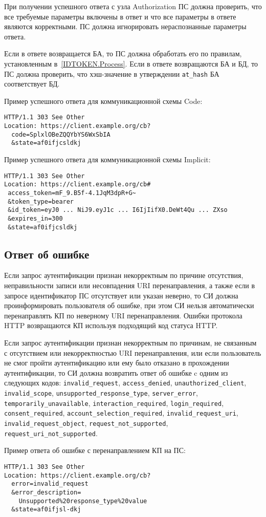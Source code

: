 При получении успешного ответа с узла Authorization ПС должна 
проверить, что все требуемые параметры включены в ответ
и что все параметры в ответе являются корректными.
%
ПС должна игнорировать нераспознанные параметры ответа.

Если в ответе возвращается БА, то ПС должна обработать его по правилам, 
установленным в~\ref{IDTOKEN.Process}. 
%
Если в ответе возвращаются БА и БД, то ПС должна проверить, что хэш-значение
в утверждении \lstinline{at_hash} БА соответствует БД.

Пример успешного ответа для коммуникационной схемы Code:
%
\begin{lstlisting}
HTTP/1.1 303 See Other
Location: https://client.example.org/cb?
  code=SplxlOBeZQQYbYS6WxSbIA
  &state=af0ifjcsldkj
\end{lstlisting}

Пример успешного ответа для коммуникационной схемы Implicit:
%
\begin{lstlisting}
HTTP/1.1 303 See Other
Location: https://client.example.org/cb#
 access_token=mF_9.B5f-4.1JqM3dpR+G~
 &token_type=bearer
 &id_token=eyJ0 ... NiJ9.eyJ1c ... I6IjIifX0.DeWt4Qu ... ZXso
 &expires_in=300
 &state=af0ifjcsldkj
\end{lstlisting}

\subsection{Ответ об ошибке}\label{REQRESP.Auth.Error}

Если запрос аутентификации признан некорректным по причине отсутствия,
неправильности записи или несовпадения URI перенаправления, а также если в
запросе идентификатор ПС отсутствует или указан неверно, то СИ должна
проинформировать пользователя об ошибке, при этом СИ нельзя автоматически
перенаправлять КП по неверному URI перенаправления. Ошибки протокола HTTP
возвращаются КП используя подходящий код статуса HTTP.

Если запрос аутентификации признан некорректным по причинам, не связанным с
отсутствием или некорректностью URI перенаправления, или если пользователь не
смог пройти аутентификацию или ему было отказано в прохождении аутентификации,
то СИ должна возвратить ответ об ошибке c одним из следующих кодов:
%
\lstinline{invalid_request}, 
\lstinline{access_denied},
\lstinline{unauthorized_client}, 
\lstinline{invalid_scope},
\lstinline{unsupported_response_type},
\lstinline{server_error}, 
\lstinline{temporarily_unavailable}, 
\lstinline{interaction_required},
\lstinline{login_required},
\lstinline{consent_required},
\lstinline{account_selection_required},
\lstinline{invalid_request_uri},
\lstinline{invalid_request_object},
\lstinline{request_not_supported}, 
\lstinline{request_uri_not_supported}. 

Пример ответа об ошибке с перенаправлением КП на ПС:
\begin{lstlisting}
HTTP/1.1 303 See Other
Location: https://client.example.org/cb?
  error=invalid_request
  &error_description=
    Unsupported%20response_type%20value
  &state=af0ifjsl-dkj
\end{lstlisting}



